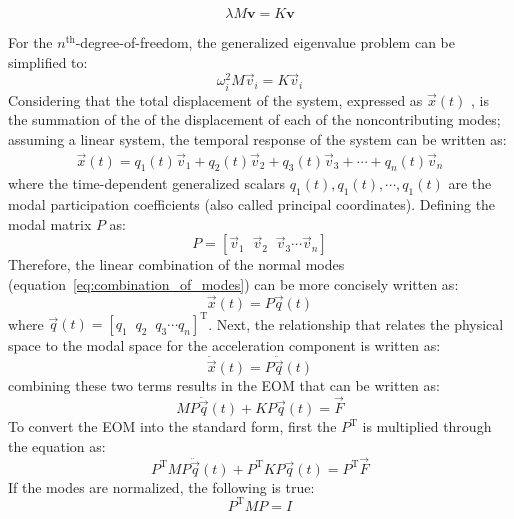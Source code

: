 \documentclass[12pt,letter]{article}
\numberwithin{ex}{section} %
\numberwithin{re}{section} %
\begin{document}
\begin{equation}
\lambda M \textbf{v} = K \textbf{v}
\end{equation}

For the $n^{\text{th}}$-degree-of-freedom, the generalized eigenvalue problem can be simplified to: 
\begin{equation}
\omega_i^2 M \vec{v}_i = K  \vec{v}_i
\end{equation}
Considering that the total displacement of the system, expressed as $\vec{x}(t)$ , is the summation of the of the displacement of each of the noncontributing modes; assuming a linear system, the temporal response of the system can be written as:
\begin{eqnarray}
\vec{x}(t) = q_1(t) \vec{v}_1 + q_2(t) \vec{v}_2 + q_3(t) \vec{v}_3 + \cdots + q_n(t) \vec{v}_n
\label{eq:combination_of_modes}
\end{eqnarray}
\noindent where the time-dependent generalized scalars $q_1(t), q_1(t), \cdots, q_1(t)$ are the modal participation coefficients (also called principal coordinates). Defining the modal matrix $P$ as:
\begin{equation}
P = [ \vec{v}_1 \; \; \vec{v}_2 \; \; \vec{v}_3 \cdots \vec{v}_n]
\end{equation}
Therefore, the linear combination of the normal modes (equation~\ref{eq:combination_of_modes}) can be more concisely written as:
\begin{equation}
\vec{x}(t) = P\vec{q}(t)
\end{equation}
where $\vec{q}(t) = [q_1 \; \; q_2 \; \; q_3 \cdots q_n]^{\text{T}}$. Next, the relationship that relates the physical space to the modal space for the acceleration component is written as:
\begin{equation}
\ddot{\vec{x}}(t) = P\ddot{\vec{q}}(t)
\end{equation}
combining these two terms results in the EOM that can be written as:
\begin{equation}
M P\ddot{\vec{q}}(t) + KP\vec{q}(t) = \vec{F}
\end{equation}
To convert the EOM into the standard form, first the $P^{\text{T}}$ is multiplied through the equation as:
\begin{equation}
P^{\text{T}} M P\ddot{\vec{q}}(t) + P^{\text{T}} K P\vec{q}(t) = P^{\text{T}} \vec{F}
\end{equation}
If the modes are normalized, the following is true:
\begin{equation}
P^{\text{T}} M P = I
\label{eq:modes_normalized}
\end{equation}
\end{document}
